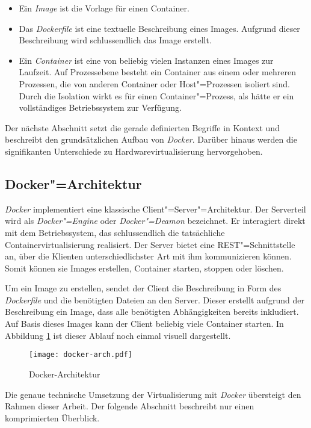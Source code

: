 \begin{itemize}
	\item Ein \textit{Image} ist die Vorlage für einen Container.
	\item Das \textit{Dockerfile} ist eine textuelle Beschreibung eines Images. Aufgrund dieser Beschreibung wird schlussendlich das Image erstellt.
	\item Ein \textit{Container} ist eine von beliebig vielen Instanzen eines Images zur Laufzeit. Auf Prozessebene besteht ein Container aus einem oder mehreren Prozessen, die von anderen Container oder Host"=Prozessen isoliert sind. Durch die Isolation wirkt es für einen Container"=Prozess, als hätte er ein vollständiges Betriebssystem zur Verfügung.
\end{itemize}

Der nächste Abschnitt setzt die gerade definierten Begriffe in Kontext und beschreibt den grundsätzlichen Aufbau von \textit{Docker}. Darüber hinaus werden die signifikanten Unterschiede zu Hardwarevirtualisierung hervorgehoben.

\subsection{Docker"=Architektur}

\textit{Docker} implementiert eine klassische Client"=Server"=Architektur. Der Serverteil wird als \textit{Docker"=Engine} oder \textit{Docker"=Deamon} bezeichnet. Er interagiert direkt mit dem Betriebssystem, das schlussendlich die tatsächliche Containervirtualisierung realisiert. Der Server bietet eine REST"=Schnittstelle an, über die Klienten unterschiedlichster Art mit ihm kommunizieren können. Somit können sie \zB Images erstellen, Container starten, stoppen oder löschen.

Um ein Image zu erstellen, sendet der Client die Beschreibung in Form des \textit{Dockerfile} und die benötigten Dateien an den Server. Dieser erstellt aufgrund der Beschreibung ein Image, dass alle benötigten Abhängigkeiten bereits inkludiert. Auf Basis dieses Images kann der Client beliebig viele Container starten. In Abbildung \ref{fig:docker-arch} ist dieser Ablauf noch einmal visuell dargestellt.

\begin{figure}[!hbt]%
\centering
\texttt{[image: docker-arch.pdf]}%
\caption{Docker-Architektur}%
\label{fig:docker-arch}%
\end{figure}

Die genaue technische Umsetzung der Virtualisierung mit \textit{Docker} übersteigt den Rahmen dieser Arbeit. Der folgende Abschnitt beschreibt nur einen komprimierten Überblick.

